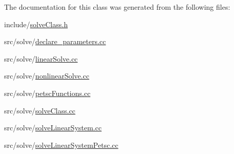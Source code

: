 The documentation for this class was generated from the following files\+:\begin{DoxyCompactItemize}
\item 
include/\mbox{\hyperlink{solve_class_8h}{solve\+Class.\+h}}\item 
src/solve/\mbox{\hyperlink{declare__parameters_8cc}{declare\+\_\+parameters.\+cc}}\item 
src/solve/\mbox{\hyperlink{linear_solve_8cc}{linear\+Solve.\+cc}}\item 
src/solve/\mbox{\hyperlink{nonlinear_solve_8cc}{nonlinear\+Solve.\+cc}}\item 
src/solve/\mbox{\hyperlink{petsc_functions_8cc}{petsc\+Functions.\+cc}}\item 
src/solve/\mbox{\hyperlink{solve_class_8cc}{solve\+Class.\+cc}}\item 
src/solve/\mbox{\hyperlink{solve_linear_system_8cc}{solve\+Linear\+System.\+cc}}\item 
src/solve/\mbox{\hyperlink{solve_linear_system_petsc_8cc}{solve\+Linear\+System\+Petsc.\+cc}}\end{DoxyCompactItemize}
